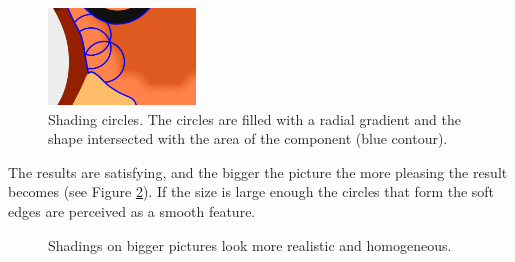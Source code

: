 \documentclass[]{usiinfbachelorproject}
\begin{document}
\begin{figure}[ht]
	\centering
	\includegraphics[width=0.35\textwidth]{img/shadingcircles.png}
	\caption{Shading circles. The circles are filled with a radial gradient and the shape intersected with the area of the component (blue contour).}
	\label{fig:circleshape}
\end{figure}

\noindent The results are satisfying, and the bigger the picture the more pleasing the result becomes (see Figure \ref{fig:shadingex}). If the size is large enough the circles that form the soft edges are perceived as a smooth feature.

\begin{figure}[ht]
	\centering
	\caption{Shadings on bigger pictures look more realistic and homogeneous.}
	\label{fig:shadingex}
\end{figure}
\end{document}

